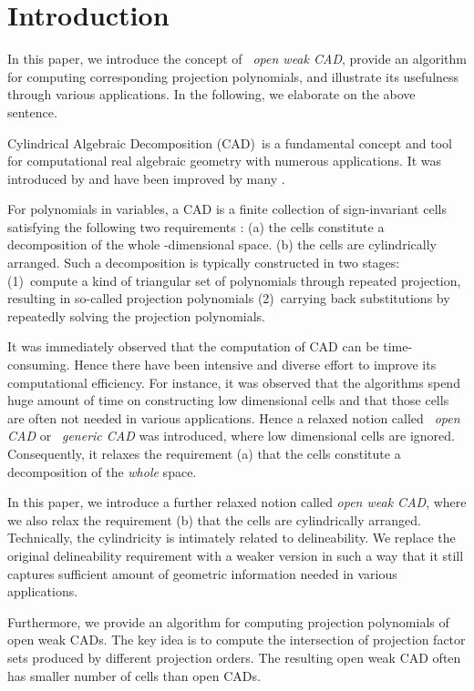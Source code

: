 \documentclass[amsthm]{elsart}
\begin{document}
\section{Introduction}
\label{secc:intro}
In this paper, we introduce the concept of {\em\ open weak CAD}, provide an algorithm for computing corresponding projection polynomials, and illustrate its usefulness through various applications. In the following, we elaborate on the above sentence.

Cylindrical Algebraic Decomposition (CAD)\ is a fundamental concept and tool for computational real algebraic geometry with numerous applications. It was introduced by
\citet{collins1,Caviness1998} and have been improved
by  many \citep{McCallum, Hong:90a, Collins_Hong:91, Hong:92a, LS93, Ren, BPR96,  McCallumeq, AnaiW01, Brown01a, Strzebonski06, Hong_Safey2012,Chen_Maza2014}.


For polynomials in  variables, a CAD is a finite collection of sign-invariant cells satisfying the following two requirements : (a) the cells constitute a  decomposition  of the whole -dimensional space.  (b) the cells  are cylindrically arranged.  Such a decomposition is typically constructed in two stages: (1)\  compute   a kind of triangular set of  polynomials through repeated projection, resulting  in so-called projection polynomials (2)\ carrying back substitutions by repeatedly solving the projection polynomials.

It  was immediately observed that the computation   of CAD can be     time-consuming. Hence there have been intensive and diverse effort to improve its computational efficiency.  For instance, it was observed that the algorithms spend  huge amount of time on  constructing low dimensional cells and that those cells are often not needed in various applications. Hence a relaxed notion called {\em\ open CAD} or {\em\ generic CAD} was introduced, where  low dimensional cells are ignored. Consequently, it relaxes the requirement (a) that the cells constitute a decomposition of the {\em whole\/} space.

In this paper, we introduce a further relaxed notion called {\em open weak CAD}, where we  also relax  the requirement (b)  that the cells  are cylindrically arranged.   Technically, the cylindricity is intimately related to  delineability.   We replace the original delineability requirement with a weaker version in such a way that it still captures sufficient amount of geometric information needed in various applications.

Furthermore, we  provide an algorithm for computing projection polynomials of open weak CADs. The key idea is to compute the intersection of projection factor sets produced by different projection orders. The resulting open weak CAD often has smaller number of cells than open CADs.
\end{document}
